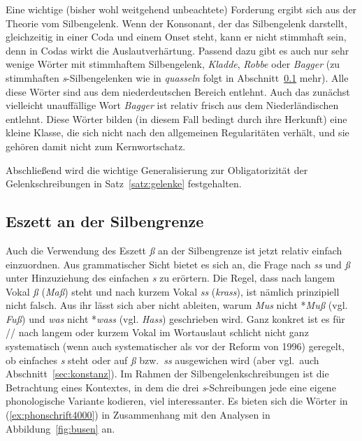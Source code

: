 Eine wichtige (bisher wohl weitgehend unbeachtete) Forderung ergibt sich aus der Theorie vom Silbengelenk.
Wenn der Konsonant, der das Silbengelenk darstellt, gleichzeitig in einer Coda und einem Onset steht, kann er nicht stimmhaft sein, denn in Codas wirkt die Auslautverhärtung.
\label{abs:robbe}Passend dazu gibt es auch nur sehr wenige Wörter mit stimmhaftem Silbengelenk, \zB \textit{Kladde}, \textit{Robbe} oder \textit{Bagger} (zu stimmhaften \textit{s}-Silbengelenken wie in \textit{quasseln} folgt in Abschnitt~\ref{sec:eszett} mehr).
Alle diese Wörter sind aus dem niederdeutschen Bereich entlehnt.
Auch das zunächst vielleicht unauffällige Wort \textit{Bagger} ist relativ frisch aus dem Niederländischen entlehnt.
Diese Wörter bilden (in diesem Fall bedingt durch ihre Herkunft) eine kleine Klasse, die sich nicht nach den allgemeinen Regularitäten verhält, und sie gehören damit nicht zum Kernwortschatz.

\newpage

Abschließend wird die wichtige Generalisierung zur Obligatorizität der Gelenkschreibungen in Satz~\ref{satz:gelenke} festgehalten.


\subsection[Eszett an der Silbengrenze]{\Opsional Eszett an der Silbengrenze}

\label{sec:eszett}

Auch die Verwendung des Eszett \textit{ß} an der Silbengrenze ist jetzt relativ einfach einzuordnen.
Aus grammatischer Sicht bietet es sich an, die Frage nach \textit{ss} und \textit{ß} unter Hinzuziehung des einfachen \textit{s} zu erörtern.
Die Regel, dass nach langem Vokal \textit{ß} (\textit{Maß}) steht und nach kurzem Vokal \textit{ss} (\textit{krass}), ist nämlich prinzipiell nicht falsch.
Aus ihr lässt sich aber nicht ableiten, warum \zB \textit{Mus} nicht *\textit{Muß} (vgl. \textit{Fuß}) und \textit{was} nicht *\textit{wass} (vgl. \textit{Hass}) geschrieben wird.
Ganz konkret ist es für // nach langem oder kurzem Vokal im Wortauslaut schlicht nicht ganz systematisch (wenn auch systematischer als vor der Reform von 1996) geregelt, ob einfaches \textit{s} steht oder auf \textit{ß} bzw.\ \textit{ss} ausgewichen wird (aber vgl.\ auch Abschnitt~\ref{sec:konstanz}).
Im Rahmen der Silbengelenkschreibungen ist die Betrachtung eines Kontextes, in dem die drei \textit{s}-Schreibungen jede eine eigene phonologische Variante kodieren, viel interessanter.
Es bieten sich die Wörter in (\ref{ex:phonschrift4000}) in Zusammenhang mit den Analysen in Abbildung~\ref{fig:busen} an.

